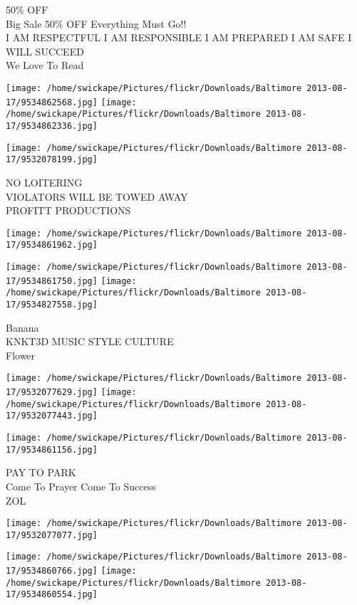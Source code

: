 \documentclass[10pt,letterpaper]{article}
\begin{document}
50\% OFF\\
Big Sale 50\% OFF Everything Must Go!!\\
I AM RESPECTFUL I AM RESPONSIBLE I AM PREPARED I AM SAFE I WILL SUCCEED\\
We Love To Read
\pagebreak

\texttt{[image: /home/swickape/Pictures/flickr/Downloads/Baltimore 2013-08-17/9534862568.jpg]}
\texttt{[image: /home/swickape/Pictures/flickr/Downloads/Baltimore 2013-08-17/9534862336.jpg]}

\vspace{0.25in}
\texttt{[image: /home/swickape/Pictures/flickr/Downloads/Baltimore 2013-08-17/9532078199.jpg]}

NO LOITERING\\
VIOLATORS WILL BE TOWED AWAY\\
PROFITT PRODUCTIONS
\pagebreak

\texttt{[image: /home/swickape/Pictures/flickr/Downloads/Baltimore 2013-08-17/9534861962.jpg]}

\vspace{0.25in}
\texttt{[image: /home/swickape/Pictures/flickr/Downloads/Baltimore 2013-08-17/9534861750.jpg]}
\texttt{[image: /home/swickape/Pictures/flickr/Downloads/Baltimore 2013-08-17/9534827558.jpg]}

Banana\\
KNKT3D MUSIC STYLE CULTURE\\
Flower
\pagebreak

\texttt{[image: /home/swickape/Pictures/flickr/Downloads/Baltimore 2013-08-17/9532077629.jpg]}
\texttt{[image: /home/swickape/Pictures/flickr/Downloads/Baltimore 2013-08-17/9532077443.jpg]}

\texttt{[image: /home/swickape/Pictures/flickr/Downloads/Baltimore 2013-08-17/9534861156.jpg]}

PAY TO PARK\\
Come To Prayer Come To Success\\
ZOL
\pagebreak

\texttt{[image: /home/swickape/Pictures/flickr/Downloads/Baltimore 2013-08-17/9532077077.jpg]}

\vspace{0.25in}
\texttt{[image: /home/swickape/Pictures/flickr/Downloads/Baltimore 2013-08-17/9534860766.jpg]}
\texttt{[image: /home/swickape/Pictures/flickr/Downloads/Baltimore 2013-08-17/9534860554.jpg]}
\end{document}
